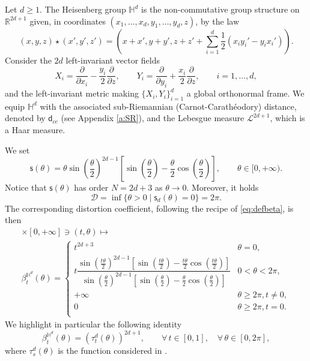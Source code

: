 \documentclass[11pt,a4paper]{article}
\theoremstyle{plain}
\theoremstyle{definition}
\theoremstyle{remark}
\numberwithin{equation}{section}
\newcommand{\R}{\mathbb{R}} %
\renewcommand{\H}{\mathbb{H}}
\newcommand{\cD}{\mathcal{D}}
\newcommand{\sfs}{\mathsf{s}}
\newcommand{\sfd}{\mathsf d}
\begin{document}
Let $d\geq 1$. The Heisenberg group $\mathbb{H}^{d}$ is the non-commutative group structure on $\R^{2d+1}$ given, in coordinates $(x_{1},\ldots,x_{d},y_{1},\ldots,y_{d},z)$, by the law
\begin{equation}
(x,y,z) \star (x',y',z') = \left(x+x',y+y', z+z'+\sum_{i=1}^{d}\frac{1}{2}(x_{i}y_{i}
'-y_{i}x_{i}')\right).
\end{equation}
Consider the $2d$ left-invariant vector fields 
\begin{equation}
X_{i} = \frac{\partial}{\partial x_{i}} -\frac{y_{i}}{2}\frac{\partial}{\partial z}, \qquad Y_{i} =\frac{\partial}{\partial y_{i}} + \frac{x_{i}}{2}\frac{\partial}{\partial z},\qquad i=1,\ldots,d,
\end{equation}
and the left-invariant metric making $\{X_{i},Y_{i}\}_{i=1}^d$ a global orthonormal frame. We equip $\mathbb{H}^{d}$ with the associated sub-Riemannian (Carnot-Carath\'eodory) distance, denoted by $\sfd_{cc}$ (see Appendix \ref{a:SR}), and the Lebesgue measure $\mathscr{L}^{2d+1}$, which is a Haar measure.

We set
\begin{equation}
\sfs(\theta) =\theta \sin\left(\frac{\theta}{2}\right)^{2d-1}\left[\sin\left(\frac{\theta}{2}\right)-\frac{\theta}{2} \cos\left(\frac{\theta}{2}\right)\right], \qquad \theta\in [0,+\infty).
\end{equation} 
Notice that $\sfs(\theta)$ has order $N=2d+3$ as $\theta \to 0$. Moreover, it holds
\begin{equation}
\cD=\inf\{\theta>0\mid \sfs_{d}(\theta)=0\}=2\pi.
\end{equation}
The corresponding distortion coefficient, following the recipe of \eqref{eq:defbeta}, is then
\begin{multline}
[0,1]\times [0,+\infty]\ni (t,\theta) \mapsto \\ \beta^{\H^d}_t(\theta) =
\begin{cases}
 t^{2d+3} &\theta =0, \\
t\dfrac{ \sin\left(\frac{t\theta}{2}\right)^{2d-1}\left[\sin\left(\frac{t\theta}{2}\right)-\frac{t\theta}{2} \cos\left(\frac{t\theta}{2}\right)\right]}{ \sin\left(\frac{\theta}{2}\right)^{2d-1}\left[\sin\left(\frac{\theta}{2}\right)-\frac{\theta}{2} \cos\left(\frac{\theta}{2}\right)\right]}& 0<\theta <2\pi,\\
 +\infty & \theta \geq 2\pi, t\neq 0, \\
0 & \theta \geq 2\pi, t= 0. \\
 \end{cases}
\end{multline}
We highlight in particular the following identity
\begin{equation}
\beta^{\H^d}_t(\theta)=(\tau_{t}^{d}(\theta))^{2d+1}, \qquad \forall\, t\in [0,1],\quad \forall\, \theta \in [0,2\pi],
\end{equation}
where $\tau_{s}^{d}(\theta)$ is the function considered in \cite[Eq.\@ (1.6)]{BKS}.
\end{document}

